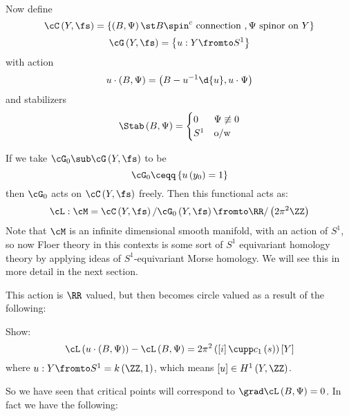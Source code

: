 \documentclass{amsart}
\begin{document}
Now define
\begin{equation}
\cC\left( Y , \fs \right) = \left\{ \left( B , \Psi \right) \st B  \spin^c \text{ connection },
\Psi \text{ spinor on } Y\right\}
\end{equation}
\begin{equation}
\cG\left( Y , \fs \right) = \left\{ u: Y\fromto S^1 \right\}
\end{equation}
with action
\begin{equation}
u\cdot \left( B , \Psi \right) = \left( B - u^{-1} \d{u} , u\cdot \Psi \right)
\end{equation}
and stabilizers
\begin{equation}
\Stab\left( B , \Psi \right) = 
\begin{cases}
0 & \Psi \not\equiv 0 \\
S^1 & \text{o/w}
\end{cases}
\end{equation}

If we take $\cG_0 \sub \cG\left( Y , \fs \right)$ to be
\begin{equation}
\cG_0 \ceqq \left\{ u\left( y_0 \right) = 1 \right\}
\end{equation}
then
$\cG_0$ acts on $\cC\left( Y ,\fs \right)$ freely. 
Then this functional acts as:
\begin{equation}
\cL : \cM = \cC\left( Y , \fs \right) / \cG_0\left( Y , \fs \right)\fromto 
\RR / \left( 2\pi^2 \ZZ \right)
\end{equation}
Note that $\cM$ is an infinite dimensional smooth manifold, with an action of $S^1$,
so now Floer theory in this contexts is some sort of $S^1$ equivariant homology theory
by applying ideas of $S^1$-equivariant Morse homology.
We will see this in more detail in the next section.

This action is $\RR$ valued, but then becomes circle valued as a result of the following:

\begin{exr}
Show:
\begin{equation}
\cL\left( u \cdot \left( B , \Psi \right) \right) - \cL\left( B , \Psi \right) = 
2\pi^2 \left( \left[ i \right] \cupp c_1\left( s \right) \right)\left[ Y \right]
\end{equation}
where $u:Y\fromto S^1 = k\left( \ZZ , 1 \right)$, which means 
$\left[ u \right]\in H^1\left( Y , \ZZ \right)$.
\end{exr}

So we have seen that critical points will correspond to $\grad \cL\left( B , \Psi \right) = 0$.
In fact we have the following:
\end{document}
